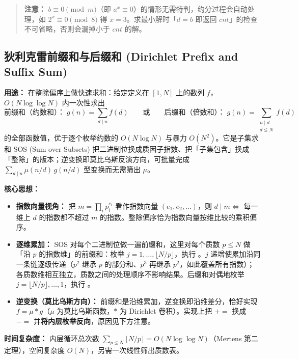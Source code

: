 \begin{quote}
\textbf{注意：} $b \equiv 0 \pmod m$（即 $a^{x} \equiv 0$）的情形无需特判，约分过程会自动处理，如 $2^{x} \equiv 0 \pmod 8$ 得 $x = 3$。求最小解时「$d = b$ 即返回 $cnt$」的检查不可省略，否则会漏掉小于 $cnt$ 的解。
\end{quote}

\subsection{狄利克雷前缀和与后缀和 (Dirichlet Prefix and Suffix Sum)}

\textbf{用途：}  
在整除偏序上做快速求和：给定定义在 $[1, N]$ 上的数列 $f$，$O(N\log\log N)$ 内一次性求出
\[ \text{前缀和（约数和）：}\; g(n)=\sum_{d\mid n}f(d) \qquad\text{或}\qquad \text{后缀和（倍数和）：}\; g(n)=\sum_{\substack{n\mid d\\ d\le N}}f(d) \]
的全部函数值，优于逐个枚举约数的 $O(N\log N)$ 与暴力 $O(N^2)$。它是子集求和 SOS (Sum over Subsets) 把二进制位换成质因子指数、把「子集包含」换成「整除」的版本；逆变换即莫比乌斯反演方向，可批量完成 $\sum_{d\mid n}\mu(n/d)\,g(n/d)$ 型变换而无需筛出 $\mu$。

\textbf{核心思想：}
\begin{itemize}
    \item \textbf{指数向量视角：} 把 $m=\prod_i p_i^{e_i}$ 看作指数向量 $(e_1,e_2,\dots)$，则 $d\mid m\iff$ 每一维上 $d$ 的指数都不超过 $m$ 的指数。整除偏序恰为指数向量按维比较的乘积偏序。
    \item \textbf{逐维累加：} SOS 对每个二进制位做一遍前缀和，这里对每个质数 $p\le N$ 做「沿 $p$ 的指数维」的前缀和：枚举 $j=1,\dots,\lfloor N/p\rfloor$，执行 。$j$ 递增使累加沿同一条链逐级传递（$p^2$ 继承 $p$ 的部分和、$p^3$ 再继承 $p^2$，如此覆盖所有指数）；各质数维相互独立，质数之间的处理顺序不影响结果。后缀和对偶地枚举 $j=\lfloor N/p\rfloor,\dots,1$，执行 。
    \item \textbf{逆变换（莫比乌斯方向）：} 前缀和是沿维累加，逆变换即沿维差分，恰好实现 $f=\mu*g$（$\mu$ 为莫比乌斯函数，$*$ 为 Dirichlet 卷积）。实现上把 $+=$ 换成 $-=$ 并\textbf{将内层枚举反向}，原因见下方注意。
\end{itemize}

\textbf{时间复杂度：} 内层循环总次数 $\sum_{p\le N}\lfloor N/p\rfloor=O(N\log\log N)$（Mertens 第二定理），空间复杂度 $O(N)$，另需一次线性筛出质数表。



